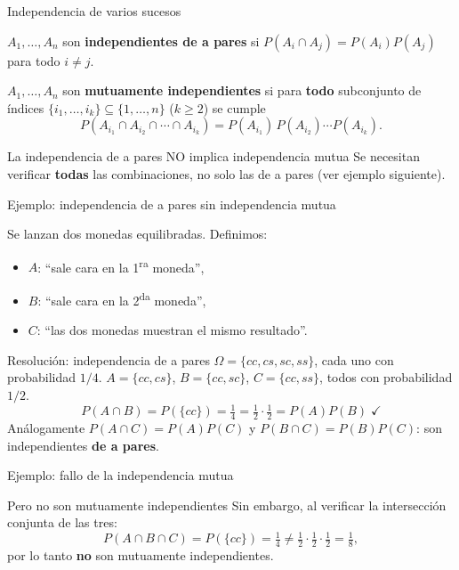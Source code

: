 \documentclass[aspectratio=169,11pt]{beamer}
\begin{document}
\begin{frame}{Independencia de varios sucesos}
\begin{definition}
$A_1,\dots,A_n$ son \textbf{independientes de a pares} si $P(A_i\cap A_j)=P(A_i)P(A_j)$ para todo $i\neq j$.
\end{definition}
\begin{definition}
$A_1,\dots,A_n$ son \textbf{mutuamente independientes} si para \textbf{todo} subconjunto de índices $\{i_1,\dots,i_k\}\subseteq\{1,\dots,n\}$ ($k\geq 2$) se cumple
\[
P(A_{i_1}\cap A_{i_2}\cap \cdots \cap A_{i_k}) = P(A_{i_1})\,P(A_{i_2})\cdots P(A_{i_k}).
\]
\end{definition}
\begin{alertblock}{La independencia de a pares NO implica independencia mutua}
Se necesitan verificar \textbf{todas} las combinaciones, no solo las de a pares (ver ejemplo siguiente).
\end{alertblock}
\end{frame}

\begin{frame}{Ejemplo: independencia de a pares sin independencia mutua}
\begin{example}
Se lanzan dos monedas equilibradas. Definimos:
\begin{itemize}
\item $A$: ``sale cara en la 1\textsuperscript{ra} moneda'',
\item $B$: ``sale cara en la 2\textsuperscript{da} moneda'',
\item $C$: ``las dos monedas muestran el mismo resultado''.
\end{itemize}
\end{example}
\begin{block}{Resolución: independencia de a pares}
$\Omega=\{cc,cs,sc,ss\}$, cada uno con probabilidad $1/4$. $A=\{cc,cs\}$, $B=\{cc,sc\}$, $C=\{cc,ss\}$, todos con probabilidad $1/2$.
\[
P(A\cap B) = P(\{cc\}) = \tfrac14 = \tfrac12\cdot\tfrac12=P(A)P(B) \;\checkmark
\]
Análogamente $P(A\cap C) = P(A)P(C)$ y $P(B\cap C)=P(B)P(C)$: son independientes \textbf{de a pares}.
\end{block}
\end{frame}

\begin{frame}{Ejemplo: fallo de la independencia mutua}
\begin{block}{Pero no son mutuamente independientes}
Sin embargo, al verificar la intersección conjunta de las tres:
\[
P(A\cap B\cap C) = P(\{cc\}) = \tfrac14 \neq \tfrac12\cdot\tfrac12\cdot\tfrac12 = \tfrac18,
\]
por lo tanto \textbf{no} son mutuamente independientes.
\end{block}
\end{frame}
\end{document}
